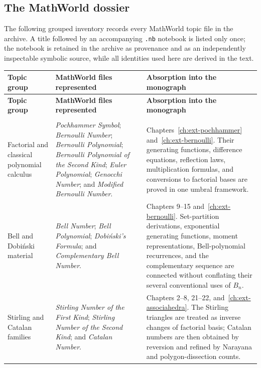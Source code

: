 \documentclass[11pt,a4paper,oneside,openany]{book}
\theoremstyle{definition}
\theoremstyle{remark}
\begin{document}
\subsection{The MathWorld dossier}
The following grouped inventory records every MathWorld topic file in the
archive.  A title followed by an accompanying \nolinkurl{.nb} notebook is
listed only once; the notebook is retained in the archive as provenance and as
an independently inspectable symbolic source, while all identities used here
are derived in the text.

\renewcommand{\arraystretch}{1.15}
\begin{longtable}{>{\raggedright\arraybackslash}p{}
                  >{\raggedright\arraybackslash}p{}
                  >{\raggedright\arraybackslash}p{}}
\toprule
\textbf{Topic group} & \textbf{MathWorld files represented} &
\textbf{Absorption into the monograph}\\
\midrule
\endfirsthead
\toprule
\textbf{Topic group} & \textbf{MathWorld files represented} &
\textbf{Absorption into the monograph}\\
\midrule
\endhead
\midrule
\multicolumn{3}{r}{\small Continued on the next page}\\
\endfoot
\bottomrule
\endlastfoot

Factorial and classical polynomial calculus
& \emph{Pochhammer Symbol}; \emph{Bernoulli Number}; \emph{Bernoulli
  Polynomial}; \emph{Bernoulli Polynomial of the Second Kind}; \emph{Euler
  Polynomial}; \emph{Genocchi Number}; and \emph{Modified Bernoulli Number}.
& Chapters~\ref{ch:ext-pochhammer} and~\ref{ch:ext-bernoulli}.  Their generating
  functions, difference equations, reflection laws, multiplication formulas,
  and conversions to factorial bases are proved in one umbral framework.\\[1ex]

Bell and Dobi\'nski material
& \emph{Bell Number}; \emph{Bell Polynomial}; \emph{Dobi\'nski's Formula}; and
  \emph{Complementary Bell Number}.
& Chapters 9--15 and~\ref{ch:ext-bernoulli}.  Set-partition derivations,
  exponential generating functions, moment representations, Bell-polynomial
  recurrences, and the complementary sequence are connected without conflating
  their several conventional uses of $B_n$.\\[1ex]

Stirling and Catalan families
& \emph{Stirling Number of the First Kind}; \emph{Stirling Number of the Second
  Kind}; and \emph{Catalan Number}.
& Chapters 2--8, 21--22, and~\ref{ch:ext-associahedra}.  The Stirling triangles
  are treated as inverse changes of factorial basis; Catalan numbers are then
  obtained by reversion and refined by Narayana and polygon-dissection counts.\\[1ex]


\end{longtable}
\end{document}
